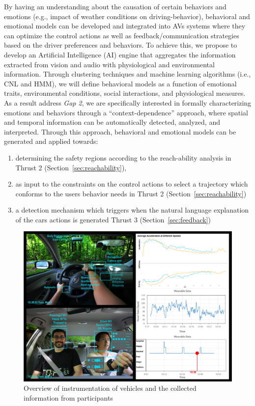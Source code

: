   By having an understanding about the causation of certain behaviors and emotions (e.g., impact of weather conditions on driving-behavior), behavioral and emotional models can be developed and integrated into AVs systems where they can optimize the control actions as well as feedback/communication strategies based on the driver preferences and behaviors. To achieve this, we propose to develop an Artificial Intelligence (AI) engine that aggregates the information extracted from vision and audio with physiological and environmental information. Through clustering techniques and machine learning algorithms (i.e., CNL and HMM), we will define behavioral models as a function of emotional traits, environmental conditions, social interactions, and physiological measures.%
  As a result address \textit{Gap 2}, we are specifically interested in formally characterizing emotions and behaviors through a “context-dependence” approach, where spatial and temporal information can be automatically detected, analyzed, and interpreted. Through this approach, behavioral and emotional models can be generated and applied towards:
 \begin{enumerate}[itemsep=0pt,parsep=0pt,topsep=4pt,leftmargin=0.4in]
     \item determining the safety regions according to the reach-ability analysis in Thrust 2 (Section~\ref{sec:reachability}),
     \item as input to the constraints on the control actions to select a trajectory which conforms to the users behavior needs in Thrust 2 (Section~\ref{sec:reachability})
     \item a detection mechanism which triggers when the natural language explanation of the cars actions is generated Thrust 3 (Section~\ref{sec:feedback})
 \end{enumerate}

 
\begin{figure}
    \centering
    \includegraphics[width=0.8\columnwidth]{figures/sensors.png}
    \caption{Overview of instrumentation of vehicles and the collected information from participants}
    \label{fig:sensors}
\end{figure}
 
